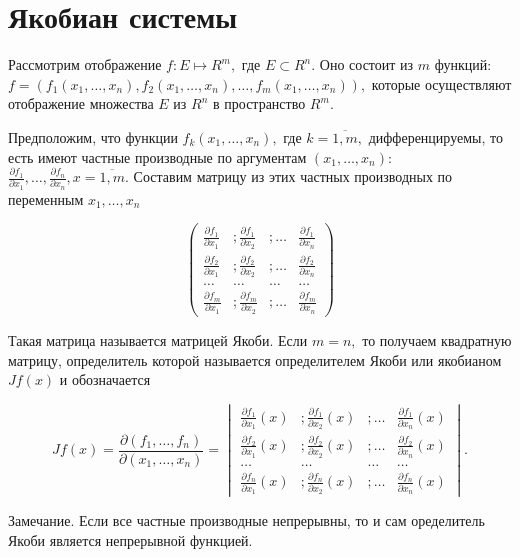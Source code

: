 \section { Якобиан системы }
    
Рассмотрим отображение $f : E \longmapsto R^m,$ где $E \subset R^n.$ Оно состоит из $m$ функций: 
$f = \left(f_1 \left(x_1,\ldots,x_n \right),f_2 \left(x_1,\ldots,x_n \right),\ldots,f_m \left(x_1,\ldots,x_n \right) \right),$ которые осуществляют отображение множества $E$ из $R^n$ в пространство $R^m.$
    		
Предположим, что функции $f_k \left(x_1,\ldots,x_n \right),$ где $k = \overline{1,m},$ дифференцируемы, то есть имеют частные производные по аргументам $(x_1,\ldots,x_n):$
$\frac{\partial f_1}{\partial x_1},\ldots,\frac{\partial f_n}{\partial x_n}, x = \overline{1,m}.$
Составим матрицу из этих частных производных по переменным $x_1,\ldots,x_n$

$$
\begin{pmatrix} \frac{\partial f_1}{\partial x_1} &; \frac{\partial f_1}{\partial x_2} &; \ldots & \frac{\partial f_1}{\partial x_n} \\ \frac{\partial f_2}{\partial x_1} &; \frac{\partial f_2}{\partial x_2} &; \ldots & \frac{\partial f_2}{\partial x_n} \\ \ldots & \ldots & \ldots & \ldots \\ \frac{\partial f_m}{\partial x_1} &; \frac{\partial f_m}{\partial x_2} &; \ldots & \frac{\partial f_m}{\partial x_n} \end{pmatrix}
$$

Такая матрица называется матрицей Якоби.
Если $m = n,$ то получаем квадратную матрицу, определитель которой называется определителем Якоби или якобианом $Jf(x)$ и обозначается

$$
Jf(x) = \frac{\partial (f_1, \ldots, f_n)}{\partial (x_1, \dots, x_n)} = \begin{vmatrix} \frac{\partial f_1}{\partial x_1}(x) &; \frac{\partial f_1}{\partial x_2}(x) &; \ldots & \frac{\partial f_1}{\partial x_n}(x) \\ \frac{\partial f_2}{\partial x_1}(x) &; \frac{\partial f_2}{\partial x_2}(x) &; \ldots & \frac{\partial f_2}{\partial x_n}(x) \\ \dots & \dots & \dots & \dots \\ \frac{\partial f_n}{\partial x_1}(x) &; \frac{\partial f_n}{\partial x_2}(x) &; \ldots & \frac{\partial f_n}{\partial x_n}(x) \end{vmatrix}.
$$
    
Замечание. Если все частные производные непрерывны, то и сам оределитель Якоби является непрерывной функцией.
